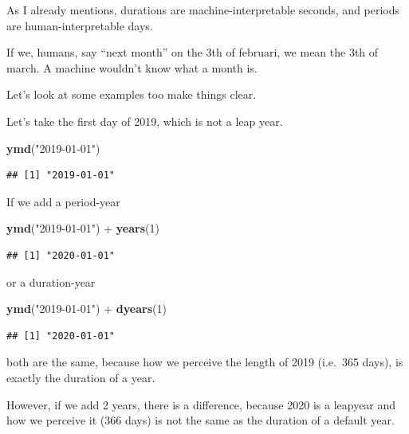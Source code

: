 \documentclass[]{tufte-book}
\newenvironment{Shaded}{}{}
\newcommand{\DecValTok}[1]{\textcolor[rgb]{0.25,0.63,0.44}{#1}}
\newcommand{\KeywordTok}[1]{\textcolor[rgb]{0.00,0.44,0.13}{\textbf{#1}}}
\newcommand{\NormalTok}[1]{#1}
\newcommand{\OperatorTok}[1]{\textcolor[rgb]{0.40,0.40,0.40}{#1}}
\newcommand{\StringTok}[1]{\textcolor[rgb]{0.25,0.44,0.63}{#1}}
\begin{document}
As I already mentions, durations are machine-interpretable seconds, and periods are human-interpretable days.

If we, humans, say ``next month'' on the 3th of februari, we mean the 3th of march. A machine wouldn't know what a month is.

Let's look at some examples too make things clear.

Let's take the first day of 2019, which is not a leap year.

\begin{Shaded}
\begin{Highlighting}[]
\KeywordTok{ymd}\NormalTok{(}\StringTok{"2019-01-01"}\NormalTok{)}
\end{Highlighting}
\end{Shaded}

\begin{verbatim}
## [1] "2019-01-01"
\end{verbatim}

If we add a period-year

\begin{Shaded}
\begin{Highlighting}[]
\KeywordTok{ymd}\NormalTok{(}\StringTok{"2019-01-01"}\NormalTok{) }\OperatorTok{+}\StringTok{ }\KeywordTok{years}\NormalTok{(}\DecValTok{1}\NormalTok{)}
\end{Highlighting}
\end{Shaded}

\begin{verbatim}
## [1] "2020-01-01"
\end{verbatim}

or a duration-year

\begin{Shaded}
\begin{Highlighting}[]
\KeywordTok{ymd}\NormalTok{(}\StringTok{"2019-01-01"}\NormalTok{) }\OperatorTok{+}\StringTok{ }\KeywordTok{dyears}\NormalTok{(}\DecValTok{1}\NormalTok{)}
\end{Highlighting}
\end{Shaded}

\begin{verbatim}
## [1] "2020-01-01"
\end{verbatim}

both are the same, because how we perceive the length of 2019 (i.e.~365 days), is exactly the duration of a year.

However, if we add 2 years, there is a difference, because 2020 is a leapyear and how we perceive it (366 days) is not the same as the duration of a default year.
\end{document}
